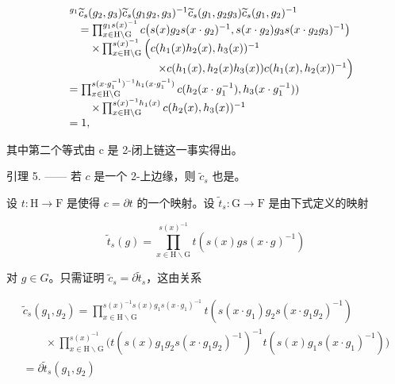 \[
\begin{array}{r l} & ^ {g _ {1}} \widetilde {c} _ {s} (g _ {2}, g _ {3}) \widetilde {c} _ {s} (g _ {1} g _ {2}, g _ {3}) ^ {- 1} \widetilde {c} _ {s} (g _ {1}, g _ {2} g _ {3}) \widetilde {c} _ {s} (g _ {1}, g _ {2}) ^ {- 1} \\ & \quad = \prod_ {x \in \mathrm{H} \backslash \mathrm{G}} ^ {g _ {1} s (x) ^ {- 1}} c \big (s (x) g _ {2} s (x \cdot g _ {2}) ^ {- 1}, s (x \cdot g _ {2}) g _ {3} s (x \cdot g _ {2} g _ {3}) ^ {- 1} \big) \\ & \qquad \times \prod_ {x \in \mathrm{H} \backslash \mathrm{G}} ^ {s (x) ^ {- 1}} \Big (c (h _ {1} (x) h _ {2} (x), h _ {3} (x)) ^ {- 1} \\ & \qquad \qquad \qquad \qquad \times c (h _ {1} (x), h _ {2} (x) h _ {3} (x))   c (h _ {1} (x), h _ {2} (x)) ^ {- 1} \Big) \\ & = \prod_ {x \in \mathrm{H} \backslash \mathrm{G}} ^ {s (x \cdot g _ {1} ^ {- 1}) ^ {- 1} h _ {1} (x \cdot g _ {1} ^ {- 1})} c (h _ {2} (x \cdot g _ {1} ^ {- 1}), h _ {3} (x \cdot g _ {1} ^ {- 1})) \\ & \qquad \times \prod_ {x \in \mathrm{H} \backslash \mathrm{G}} ^ {s (x) ^ {- 1} h _ {1} (x)} c (h _ {2} (x), h _ {3} (x)) ^ {- 1} \\ & = 1, \end{array}
\]

其中第二个等式由 c 是 2-闭上链这一事实得出。

引理 5. —— 若 \(c\) 是一个 2-上边缘，则 \(\widetilde{c}_s\) 也是。

设 \(t: \mathrm{H} \to \mathrm{F}\) 是使得 \(c = \partial t\) 的一个映射。设 \(\widetilde{t}_s: \mathrm{G} \to \mathrm{F}\) 是由下式定义的映射

\[
\widetilde {t} _ {s} (g) = \prod_ {x \in \mathrm{H} \backslash \mathrm{G}} ^ {s (x) ^ {- 1}} t (s (x) g s (x \cdot g) ^ {- 1})
\]

对 \(g \in G\)。只需证明 \(\widetilde{c}_{s} = \partial\widetilde{t}_{s}\)，这由关系

\[
\begin{array}{l} \widetilde {c} _ {s} (g _ {1}, g _ {2}) = \prod_ {x \in \mathrm{H} \backslash \mathrm{G}} ^ {s (x) ^ {- 1} s (x) g _ {1} s (x \cdot g _ {1}) ^ {- 1}} t (s (x \cdot g _ {1}) g _ {2} s (x \cdot g _ {1} g _ {2}) ^ {- 1}) \\ \qquad \times \prod_ {x \in \mathrm{H} \backslash \mathrm{G}} ^ {s (x) ^ {- 1}} \big (t (s (x) g _ {1} g _ {2} s (x \cdot g _ {1} g _ {2}) ^ {- 1}) ^ {- 1} t (s (x) g _ {1} s (x \cdot g _ {1}) ^ {- 1}) \big) \\ = \partial \widetilde {t} _ {s} (g _ {1}, g _ {2}) \end{array}
\]

